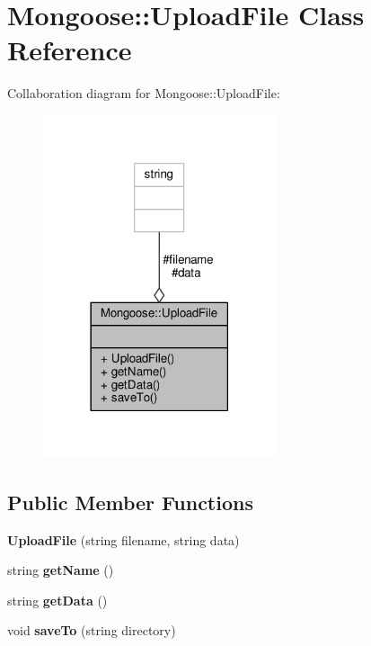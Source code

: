 \hypertarget{classMongoose_1_1UploadFile}{}\section{Mongoose\+:\+:Upload\+File Class Reference}
\label{classMongoose_1_1UploadFile}


Collaboration diagram for Mongoose\+:\+:Upload\+File\+:
\nopagebreak
\begin{figure}[H]
\begin{center}
\leavevmode
\includegraphics[width=194pt]{db/dfe/classMongoose_1_1UploadFile__coll__graph}
\end{center}
\end{figure}
\subsection*{Public Member Functions}
\begin{DoxyCompactItemize}
\item 
{\bfseries Upload\+File} (string filename, string data)\hypertarget{classMongoose_1_1UploadFile_aa59c798094b9b8346c089f54ca093bb1}{}\label{classMongoose_1_1UploadFile_aa59c798094b9b8346c089f54ca093bb1}

\item 
string {\bfseries get\+Name} ()\hypertarget{classMongoose_1_1UploadFile_a814d338066ba900de8e45392dcf07dd9}{}\label{classMongoose_1_1UploadFile_a814d338066ba900de8e45392dcf07dd9}

\item 
string {\bfseries get\+Data} ()\hypertarget{classMongoose_1_1UploadFile_af586f81dcb43656e9638cd6d23a8bed8}{}\label{classMongoose_1_1UploadFile_af586f81dcb43656e9638cd6d23a8bed8}

\item 
void {\bfseries save\+To} (string directory)\hypertarget{classMongoose_1_1UploadFile_a18594dedc2457958d6b11697aff901d6}{}\label{classMongoose_1_1UploadFile_a18594dedc2457958d6b11697aff901d6}

\end{DoxyCompactItemize}
